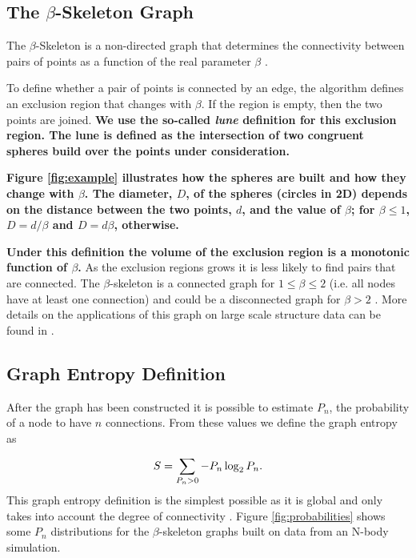 \documentclass[fleqn,usenatbib]{mnras}
\begin{document}
\subsection{The $\beta$-Skeleton Graph}

The $\beta$-Skeleton is a non-directed graph that determines the
connectivity between pairs of points as a function of the real
parameter $\beta$ \citep{1985Kirkpatrick}. 

To define whether a pair of points is connected by an edge, the
algorithm defines an exclusion region that changes with $\beta$.  
If the region is empty, then the two points are joined.
\textbf{We use the so-called \emph{lune} definition for this exclusion region.
The lune is defined as the intersection of two congruent spheres build over the points under consideration.}

\textbf{Figure \ref{fig:example} illustrates how the spheres are built and how they change 
with $\beta$.
The diameter, $D$, of the spheres (circles in 2D) depends on the
distance between the two points, $d$, and the value of $\beta$; for
$\beta \leq 1$, $D=d/\beta$ and $D=d\beta$, otherwise.}

\textbf{Under this definition the volume of the exclusion region is a
monotonic function of $\beta$.}
As the exclusion regions grows it is less likely to find pairs that are connected.
The $\beta$-skeleton is a connected graph for $1\leq \beta\leq 2$
(i.e. all nodes have at least
one connection) and could be a disconnected graph for $\beta>2$ \citep{bose2002spanning}.
More details on the applications of this graph on large scale structure data
can be found in \citep{2019MNRAS.485.5276F}.

\subsection{Graph Entropy Definition}

After the graph has been constructed it is possible to estimate $P_n$, the probability of 
a node to have $n$ connections.
From these values we define the graph entropy as

\begin{equation}
\centering
    S = \displaystyle\sum_{P_n>0}-P_n\log_2{P_n}.
    \label{ecuacionEntropia}
\end{equation}
%
This graph entropy definition is the simplest possible as it is global and only 
takes into account the degree of connectivity \citep{2012Entrp..14..559M}. 
Figure \ref{fig:probabilities} shows some $P_n$ distributions for the 
$\beta$-skeleton graphs built on data from an N-body simulation.
\end{document}
